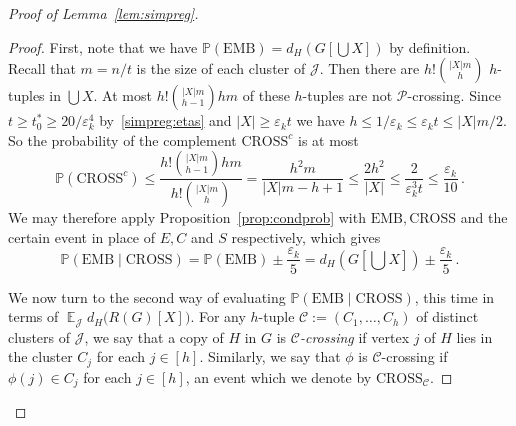 \documentclass[12pt,a4paper]{amsart}
\let\eps\varepsilon
\newcommand{\oldqed}{}
\def\endofClaim{\hfill\scalebox{.6}{$\Box$}}
\newenvironment{claimproof}[1][Proof]{
  \renewcommand{\oldqed}{\qedsymbol}
  \renewcommand{\qedsymbol}{\endofClaim}
  \begin{proof}[#1]
}{
  \end{proof}
  \renewcommand{\qedsymbol}{\oldqed}
}
\newcommand{\Prob}{\mathbb{P}}
\newcommand{\Exp}{\mathop{\mathbb{E}}}
\newcommand{\cJ}{\mathcal{J}}
\newcommand{\Part}{\mathcal{P}}
\newcommand{\HOM}{\text{EMB}}
\newcommand{\CROSS}{\mathrm{CROSS}}
\begin{document}
\begin{proof}[Proof of Lemma~\ref{lem:simpreg}]
\begin{claimproof}
First, note that we have $\Prob(\HOM) =
d_H(G[\bigcup X])$ by definition. Recall that $m = n/t$ is the size of each
cluster of $\cJ$. Then there are $h!\binom{|X|m}{h}$ $h$-tuples in $\bigcup X$. At
most $h!\binom{|X|m}{h-1}hm$ of these $h$-tuples are not $\Part$-crossing. 
Since $t \geq t_0^* \geq 20/\eps_k^4$ by~\eqref{simpreg:etas} and $|X|\ge\eps_k t$ we have
$h \leq 1/\eps_k \leq \eps_k t \leq |X|m/2$. 
So the
probability of the complement $\CROSS^c$ is at most
\[\Prob(\CROSS^c) \leq \frac{h!\binom{|X|m}{h-1}hm}{h!\binom{|X|m}{h}} = \frac{h^2m}{|X|m - h+1} \leq
\frac{2h^2}{|X|} \leq \frac{2}{\eps_k^3 t} \leq \frac{\eps_k}{10}\,.\] 
We may therefore apply Proposition~\ref{prop:condprob} with $\HOM, \CROSS$ and the certain event in place of $E, C$ and $S$ respectively, which gives
\begin{equation}\label{expect:dHHomCross} 
\Prob(\HOM \mid \CROSS) = \Prob(\HOM) \pm \frac{\eps_k}{5} = d_H\left(G\left[\bigcup X\right]\right) \pm \frac{\eps_k}{5}\,.
\end{equation}

We now turn to the second way of evaluating $\Prob(\HOM\mid\CROSS)$, this time in terms of $\Exp_\cJ d_H\big(R(G)[X]\big)$. For any 
$h$-tuple $\mathcal{C} := (C_1, \dots, C_h)$ of distinct clusters of $\cJ$, we say that a copy of $H$ in $G$ is \emph{$\mathcal{C}$-crossing} if vertex $j$ of $H$ lies in the cluster $C_j$ for each $j \in [h]$. Similarly, we say that $\phi$ is $\mathcal{C}$-crossing if $\phi(j) \in C_j$ for each $j \in [h]$, an event which we denote by $\CROSS_\mathcal{C}$.


\end{claimproof}
\end{proof}
\end{document}
